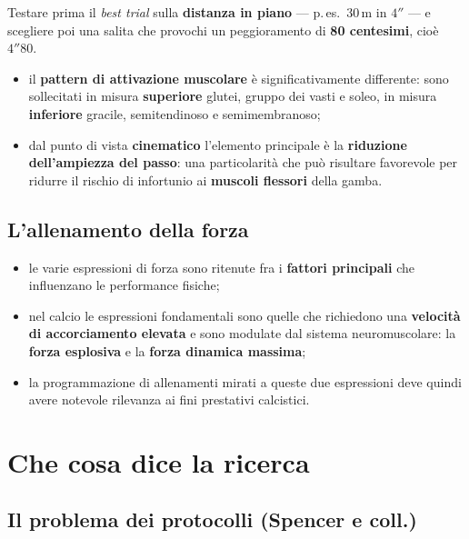 Testare prima il \textit{best trial} sulla \textbf{distanza in piano} --- p.\,es.\ 30\,m in $4''$ ---
e scegliere poi una salita che provochi un peggioramento di \textbf{80 centesimi}, cioè $4''80$.

\begin{itemize}
  \item il \textbf{pattern di attivazione muscolare} è significativamente differente: sono
    sollecitati in misura \textbf{superiore} glutei, gruppo dei vasti e soleo, in misura
    \textbf{inferiore} gracile, semitendinoso e semimembranoso;
  \item dal punto di vista \textbf{cinematico} l'elemento principale è la \textbf{riduzione
    dell'ampiezza del passo}: una particolarità che può risultare favorevole per ridurre il rischio
    di infortunio ai \textbf{muscoli flessori} della gamba.
\end{itemize}

\subsection{L'allenamento della forza}

\begin{itemize}
  \item le varie espressioni di forza sono ritenute fra i \textbf{fattori principali} che influenzano
    le performance fisiche;
  \item nel calcio le espressioni fondamentali sono quelle che richiedono una \textbf{velocità di
    accorciamento elevata} e sono modulate dal sistema neuromuscolare: la \textbf{forza esplosiva} e
    la \textbf{forza dinamica massima};
  \item la programmazione di allenamenti mirati a queste due espressioni deve quindi avere notevole
    rilevanza ai fini prestativi calcistici.
\end{itemize}

\section{Che cosa dice la ricerca}

\subsection{Il problema dei protocolli (Spencer e coll.)}


